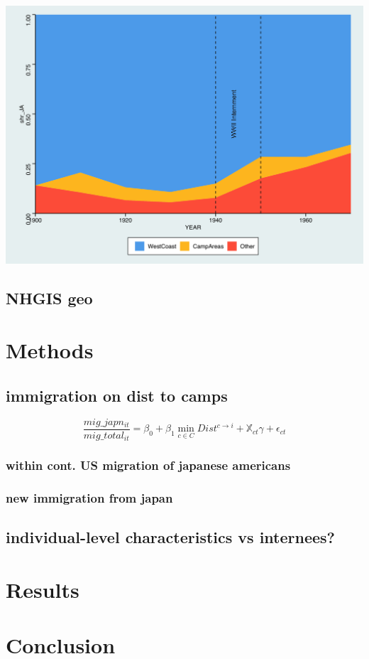 \documentclass[12pt]{article}
\begin{document}
\includegraphics[width=1.0\textwidth]{figures/shareareaplot.png}

\subsection{NHGIS geo}\label{nhgis-geo}

\section{Methods}\label{methods}

\subsection{immigration on dist to
camps}\label{immigration-on-dist-to-camps}

\begin{equation}
    \frac{mig\_japn_{it}}{mig\_total_{it}} = \beta_0 + \beta_1 \min_{c\in C} Dist^{c\rightarrow i} 
+ \mathbb{X}_{ct} \gamma +  \epsilon_{ct}
\end{equation}

\subsubsection{within cont. US migration of japanese
americans}\label{within-cont.-us-migration-of-japanese-americans}

\subsubsection{new immigration from
japan}\label{new-immigration-from-japan}

\subsection{individual-level characteristics vs
internees?}\label{individual-level-characteristics-vs-internees}

\section{Results}\label{results}





\section{Conclusion}\label{conclusion}



\end{document}
